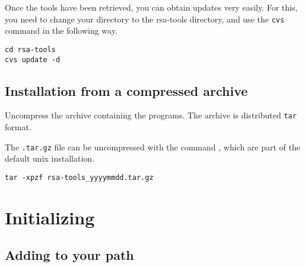 \documentclass{book}
\begin{document}
Once the tools have been retrieved, you can obtain updates very
easily. For this, you need to change your directory to the rsa-tools
directory, and use the \texttt{cvs} command in the following way.

\begin{footnotesize}
\begin{verbatim}
cd rsa-tools
cvs update -d
\end{verbatim}
\end{footnotesize}



\section{Installation from a compressed archive}

Uncompress the archive containing the programs. The archive is
distributed \texttt{tar} format.

The \texttt{.tar.gz} file can be uncompressed with the command
, which are part of the default unix installation.

\begin{footnotesize}
\begin{verbatim}
tar -xpzf rsa-tools_yyyymmdd.tar.gz
\end{verbatim}
\end{footnotesize}

\chapter{Initializing \RSAT}

\section{Adding \RSAT to your path}
\end{document}
